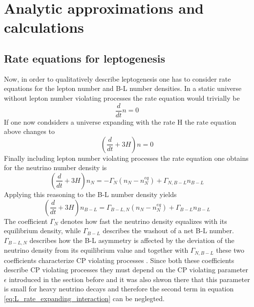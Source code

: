  \chapter{Analytic approximations and calculations}
 
\section{Rate equations for leptogenesis}
Now, in order to qualitatively describe leptogenesis one has to consider rate equations for the lepton number and B-L number densities. In a static universe without lepton number violating processes the rate equation would trivially be
\begin{equation}
	\frac{d}{dt}n=0
	\label{eq:rate_static_nointeraction}
\end{equation}
If one now condsiders a universe expanding with the rate H the rate equation above changes to
\begin{equation}
\left(\frac{d}{dt}+3H\right)n=0
\label{eq:rate_expanding_nointeraction}
\end{equation}
Finally including lepton number violating processes the rate equation one obtains for the neutrino number density is
\begin{equation}
\left(\frac{d}{dt}+3H\right)n_N=-\Gamma_N\left(n_N-n_N^{eq}\right)+\Gamma_{N,B-L}n_{B-L}
\label{eq:L_rate_expanding_interaction}
\end{equation}
Applying this reasoning to the B-L number density yields
\begin{equation}
\left(\frac{d}{dt}+3H\right)n_{B-L}=\Gamma_{B-L,N}\left(n_N-n_N^{eq}\right)+\Gamma_{B-L}n_{B-L}
\label{eq:B-L_rate_expanding_interaction}
\end{equation}
The coefficient $\Gamma_N$ denotes how fast the neutrino density equalizes with its equilibrium density, while $\Gamma_{B-L}$ describes the washout of a net B-L number. $\Gamma_{B-L,N}$ describes how the B-L asymmetry is affected by the deviation of the neutrino density from its equilibrium value and together with $\Gamma_{N,B-L}$ these two coefficients characterize CP violating processes \cite[p. 4]{Bodeker:2013qaa}. Since both these coefficients describe CP violating processes they must depend on the CP violating parameter $\epsilon$ introduced in the section before and it was also shwon there that this parameter is small for heavy neutrino decays and therefore the second term in equation \eqref{eq:L_rate_expanding_interaction} can be neglegted. \newline
